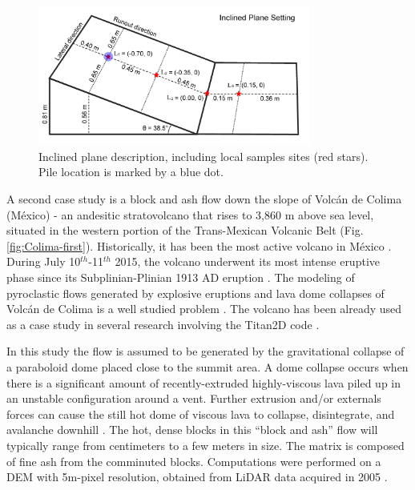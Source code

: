 \documentclass{article}
\begin{document}
\begin{figure}[H]
    \includegraphics[width=0.8\textwidth]{InclinedPlane/inclPlaneFig.jpg}
    \centering
    \caption{Inclined plane description, including local samples sites (red stars). Pile location is marked by a blue dot.}
    \label{fig:Ramp-first}
\end{figure}

A second case study is a block and ash flow down the slope of Volc{\'a}n de Colima (M{\'e}xico) - an andesitic stratovolcano that rises to 3,860 m above sea level, situated in the western portion of the Trans-Mexican Volcanic Belt (Fig. \ref{fig:Colima-first}). Historically, it has been the most active volcano in M{\'e}xico \citep{DeLaCruzReina1993, Zobin2002, Gonzalez2002}. During July 10$^{th}$-11$^{th}$ 2015, the volcano underwent its most intense eruptive phase since its Subplinian-Plinian 1913 AD eruption \citep{Saucedo2010, Zobin2015, ReyesDaVilla2016, Capra2016}. The modeling of pyroclastic flows generated by explosive eruptions and lava dome collapses of Volc{\'a}n de Colima is a well studied problem \citep{DelPozzo1995,Sheridan1995,Saucedo2002,Saucedo2004,Saucedo2005, Sarocchi2011, Capra2015}. The volcano has been already used as a case study in several research involving the Titan2D code \citep{Rupp2004, Rupp2006, Dalbey2008, Yu2009, Sulpizio2010, Capra2011, Aghakhani2016}.

In this study the flow is assumed to be generated by the gravitational collapse of a paraboloid dome placed close to the summit area. A dome collapse occurs when there is a significant amount of recently-extruded highly-viscous lava piled up in an unstable configuration around a vent. Further extrusion and/or externals forces can cause the still hot dome of viscous lava to collapse, disintegrate, and avalanche downhill \citep{Bursik2005}. The hot, dense blocks in this ``block and ash'' flow will typically range from centimeters to a few meters in size. The matrix is composed of fine ash from the comminuted blocks. Computations were performed on a DEM with 5m-pixel resolution, obtained from LiDAR data acquired in 2005 \citep{Davila2007, Sulpizio2010}.
\end{document}

